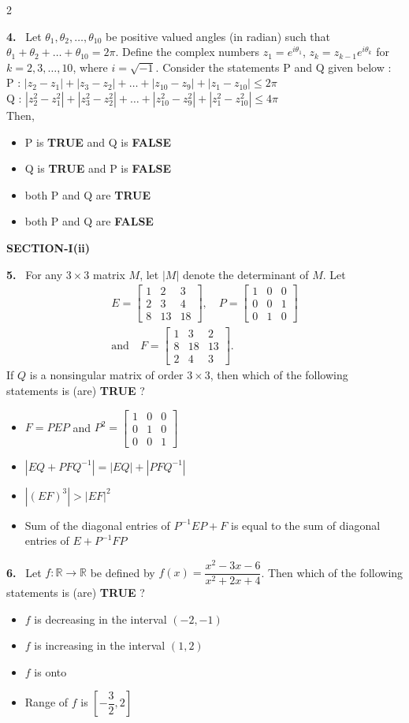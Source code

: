 \documentclass[10pt]{extarticle}
\newcommand{\sect}[1]{\par\smallskip\noindent\textbf{#1}\par}
\newcommand{\qn}[1]{\par\smallskip\noindent\textbf{#1.}~}
\newenvironment{qoptions}{\begin{itemize}[leftmargin=1.8em,itemsep=1pt,topsep=2pt,label={}]}{\end{itemize}}
\newcommand{\opt}[2]{\item[(#1)] #2}
\begin{document}
\begin{multicols}{2}
\qn{4} Let $\theta_1,\theta_2,\dots,\theta_{10}$ be positive valued angles (in radian) such that $\theta_1+\theta_2+\dots+\theta_{10}=2\pi$. Define the complex numbers $z_1=e^{i\theta_1}$, $z_k=z_{k-1}e^{i\theta_k}$ for $k=2,3,\dots,10$, where $i=\sqrt{-1}$. Consider the statements P and Q given below :\\
P : $|z_2-z_1|+|z_3-z_2|+\dots+|z_{10}-z_9|+|z_1-z_{10}|\le2\pi$\\
Q : $|z_2^2-z_1^2|+|z_3^2-z_2^2|+\dots+|z_{10}^2-z_9^2|+|z_1^2-z_{10}^2|\le4\pi$\\
Then,
\begin{qoptions}
\opt{A}{P is \textbf{TRUE} and Q is \textbf{FALSE}}
\opt{B}{Q is \textbf{TRUE} and P is \textbf{FALSE}}
\opt{C}{both P and Q are \textbf{TRUE}}
\opt{D}{both P and Q are \textbf{FALSE}}
\end{qoptions}

\sect{SECTION-I(ii)}
\qn{5} For any $3\times3$ matrix $M$, let $|M|$ denote the determinant of $M$. Let
\begin{gather*}
E=\begin{bmatrix}1&2&3\\2&3&4\\8&13&18\end{bmatrix},\quad
P=\begin{bmatrix}1&0&0\\0&0&1\\0&1&0\end{bmatrix}\\
\text{and}\quad F=\begin{bmatrix}1&3&2\\8&18&13\\2&4&3\end{bmatrix}.
\end{gather*}
If $Q$ is a nonsingular matrix of order $3\times3$, then which of the following statements is (are) \textbf{TRUE} ?
\begin{qoptions}
\opt{A}{$F=PEP$ and $P^2=\begin{bmatrix}1&0&0\\0&1&0\\0&0&1\end{bmatrix}$}
\opt{B}{$|EQ+PFQ^{-1}|=|EQ|+|PFQ^{-1}|$}
\opt{C}{$\left|(EF)^3\right|>|EF|^2$}
\opt{D}{Sum of the diagonal entries of $P^{-1}EP+F$ is equal to the sum of diagonal entries of $E+P^{-1}FP$}
\end{qoptions}

\qn{6} Let $f:\mathbb R\to\mathbb R$ be defined by $f(x)=\dfrac{x^2-3x-6}{x^2+2x+4}$. Then which of the following statements is (are) \textbf{TRUE} ?
\begin{qoptions}
\opt{A}{$f$ is decreasing in the interval $(-2,-1)$}
\opt{B}{$f$ is increasing in the interval $(1,2)$}
\opt{C}{$f$ is onto}
\opt{D}{Range of $f$ is $\left[-\dfrac32,2\right]$}
\end{qoptions}


\end{multicols}
\end{document}
